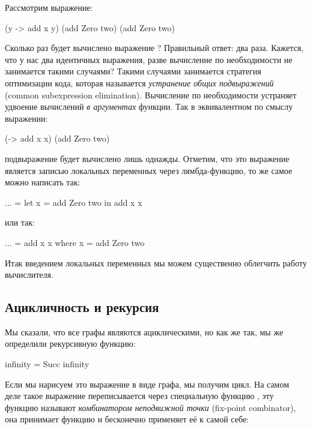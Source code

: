 Рассмотрим выражение:

\begin{code}
(\x y -> add x y) (add Zero two) (add Zero two)
\end{code}

Сколько раз будет вычислено выражение ? Правильный
ответ: два раза. Кажется, что у нас два идентичных выражения, разве
вычисление по необходимости не занимается такими случаями? 
Такими случаями занимается стратегия оптимизации кода, которая
называется \emph{устранение общих подвыражений} 
(common subexpression elimination). Вычисление по необходимости
устраняет удвоение вычислений \emph{в аргументах} функции.
Так в эквивалентном по смыслу выражении:

\begin{code}
(\x -> add x x) (add Zero two) 
\end{code}

\noindent подвыражение  будет вычислено лишь однажды.
Отметим, что это выражение является записью локальных
переменных через лямбда-функцию, то же самое можно написать так:

\begin{code}
... = let x = add Zero two
      in  add x x
\end{code}

или так:

\begin{code}
... = add x x
        where x = add Zero two
\end{code}

Итак введением локальных переменных мы можем существенно
облегчить работу вычислителя. 

\subsection{Ацикличность и рекурсия}

Мы сказали, что все графы являются ациклическими, но как же так,
мы же определили рекурсивную функцию:

\begin{code}
infinity = Succ infinity
\end{code}

Если мы нарисуем это выражение в виде графа, мы получим цикл.
На самом деле такое выражение переписывается через специальную
функцию , эту функцию называют \emph{комбинатором 
неподвижной точки} (fix-point combinator), она принимает функцию и бесконечно
применяет её к самой себе:


